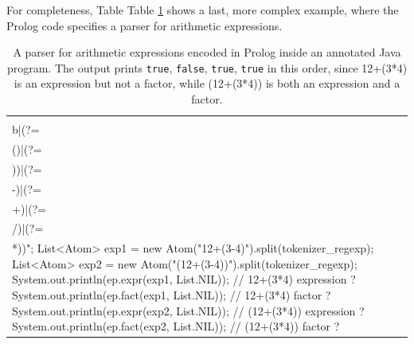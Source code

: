 For completeness, Table Table \ref{tab:pj-example4} shows a last, more complex example, where the Prolog code specifies a parser for arithmetic expressions.

\begin{table}
{\footnotesize
\begin{tabular}[-1cm]{p{12cm}}
\begin{verbatim}
import alice.tuprologx.pj.annotations.*;
import alice.tuprologx.pj.engine.*;
import alice.tuprologx.pj.model.*;
import alice.tuprologx.pj.meta.*;

@PrologClass
public abstract class PJParser {
  @PrologMethod (clauses={"expr(L,R):-term(L,R).",
                          "expr(L,R):-term(L,['+'|R2]), expr(R2,R).",
                          "expr(L,R):-term(L,['-'|R2]), expr(R2,R)."})
  public abstract <$E extends List<?>, $R extends List<?>>
  Boolean expr($E expr, $R rest);

  @PrologMethod (clauses={"term(L,R):-fact(L,R).",
                          "term(L,R):-fact(L,['*'|R2]), term(R2,R).",
                          "term(L,R):-fact(L,['/'|R2]), term(R2,R)."})
  public abstract <$T extends List<?>, $R extends List<?>>
  Boolean term($T term, $R rest);
	
  @PrologMethod (clauses={"fact(L,R):-num(L,R).",
                          "fact(['(' | E],R):-expr(E,[')'|R])."})
  public abstract <$F extends List<?>, $R extends List<?>>
  Boolean fact($F fact, $R rest);
	
  @PrologMethod (clauses={"num([L|R],R):-num_atom(_,L)."})
  public abstract <$N extends List<?>, $R extends List<?>>
  Boolean num($N num, $R rest);
	
  public static void main(String[] args) throws Exception {
    PJParser ep = PJ.newInstance(PJParser.class);
    String tokenizer_regexp =
      "(?<!^)(\\b|(?=\\()|(?=\\))|(?=\\-)|(?=\\+)|(?=\\/)|(?=\\*))";
    List<Atom> exp1 = new Atom("12+(3-4)").split(tokenizer_regexp);
    List<Atom> exp2 = new Atom("(12+(3-4))").split(tokenizer_regexp);
    System.out.println(ep.expr(exp1, List.NIL)); // 12+(3*4)   expression ?
    System.out.println(ep.fact(exp1, List.NIL)); // 12+(3*4)   factor ?
    System.out.println(ep.expr(exp2, List.NIL)); // (12+(3*4)) expression ?
    System.out.println(ep.fact(exp2, List.NIL)); // (12+(3*4)) factor ?
  }
}\end{verbatim}
\end{tabular}
}\caption{A parser for arithmetic expressions encoded in Prolog inside an annotated Java program. The output prints \texttt{true}, \texttt{false}, \texttt{true}, \texttt{true} in this order, since 12+(3*4) is an expression but not a factor, while (12+(3*4)) is both an expression and a factor.}
\label{tab:pj-example4}
\end{table}
